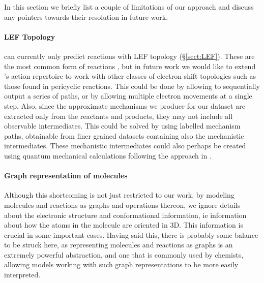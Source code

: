 
In this section we briefly list a couple of limitations of our approach and discuss any pointers towards their resolution in future work.

\paragraph{LEF Topology}

\ourModel can currently only predict reactions with LEF topology (\S \ref{sect:LEF}). 
These are the most common form of reactions \citep{herges1994organizing}, but in future work we would like to extend \ourModel's action repertoire to work with other classes of electron shift topologies such as those found in pericyclic reactions.
 This could be done by allowing \ourModel to sequentially output a series of paths, or by allowing multiple electron movements at a single step. 
 Also, since the approximate mechanisms we produce for our dataset are extracted only from the reactants and products, they may not include all observable intermediates. This could be solved by using labelled mechanism paths, obtainable from finer grained datasets containing also the mechanistic intermediates. 
 These mechanistic intermediates could also perhaps be created using quantum mechanical calculations following the approach in \citet{Sadowski2016-qg}.
 
 \paragraph{Graph representation of molecules}

 Although this shortcoming is not just restricted to our work, by modeling molecules and reactions as graphs and operations thereon, we ignore details about the electronic structure and conformational information, ie information about how the atoms in the molecule are oriented in 3D. 
 This information is crucial in some important cases.
 Having said this, there is probably some balance to be struck here, as representing molecules and reactions as graphs is an extremely powerful abstraction, and one that is commonly used by chemists, allowing models working with such graph representations to be more easily interpreted.


 
 
